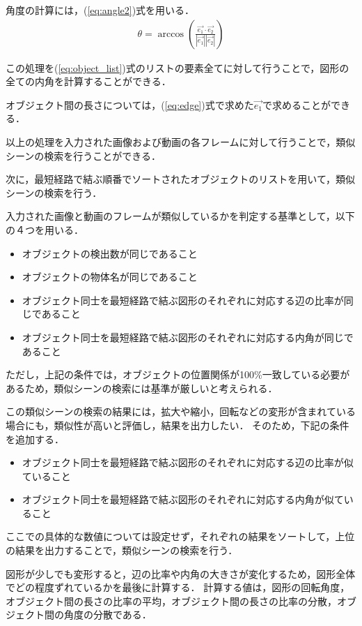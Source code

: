 \documentclass[a4j,12pt,dvipdfmx]{jreport}
\begin{document}
角度の計算には，(\ref{eq:angle2})式を用いる．
\begin{eqnarray}
  \label{eq:angle2}
  \theta = \arccos \left( \frac{\vec{e_1} \cdot \vec{e_2}}{|\vec{e_1}| |\vec{e_2}|} \right)
\end{eqnarray}

この処理を(\ref{eq:object_list})式のリストの要素全てに対して行うことで，図形の全ての内角を計算することができる．

オブジェクト間の長さについては，(\ref{eq:edge})式で求めた$\vec{e_1}$で求めることができる．


以上の処理を入力された画像および動画の各フレームに対して行うことで，類似シーンの検索を行うことができる．


次に，最短経路で結ぶ順番でソートされたオブジェクトのリストを用いて，類似シーンの検索を行う．

入力された画像と動画のフレームが類似しているかを判定する基準として，以下の４つを用いる．
\begin{itemize}
  \item オブジェクトの検出数が同じであること
  \item オブジェクトの物体名が同じであること
  \item オブジェクト同士を最短経路で結ぶ図形のそれぞれに対応する辺の比率が同じであること
  \item オブジェクト同士を最短経路で結ぶ図形のそれぞれに対応する内角が同じであること
\end{itemize}

ただし，上記の条件では，オブジェクトの位置関係が100\%一致している必要があるため，類似シーンの検索には基準が厳しいと考えられる．

この類似シーンの検索の結果には，拡大や縮小，回転などの変形が含まれている場合にも，類似性が高いと評価し，結果を出力したい．
そのため，下記の条件を追加する．
\begin{itemize}
  \item オブジェクト同士を最短経路で結ぶ図形のそれぞれに対応する辺の比率が似ていること
  \item オブジェクト同士を最短経路で結ぶ図形のそれぞれに対応する内角が似ていること
\end{itemize}
ここでの具体的な数値については設定せず，それぞれの結果をソートして，上位の結果を出力することで，類似シーンの検索を行う．

図形が少しでも変形すると，辺の比率や内角の大きさが変化するため，図形全体でどの程度ずれているかを最後に計算する．
計算する値は，図形の回転角度，オブジェクト間の長さの比率の平均，オブジェクト間の長さの比率の分散，オブジェクト間の角度の分散である．
\end{document}
